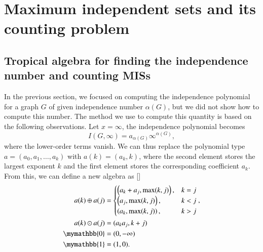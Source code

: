 \documentclass[onefignum, onetabnum]{siamart190516}
\newcommand{\<}{\langle}
\renewcommand{\>}{\rangle}
\newcommand{\red}[1]{[{\bf  \color{red}{ST: #1}}]}
\begin{document}
\section{Maximum independent sets and its counting problem}
\subsection{Tropical algebra for finding the independence number and counting MISs}
In the previous section, we focused on computing the independence polynomial for a graph $G$ of given independence number $\alpha(G)$, but we did not show how to compute this number. The method we use to compute this quantity is based on the following observations. Let $x=\infty$, the independence polynomial becomes
\begin{equation}
I(G, \infty) = a_{\alpha(G)} \infty^{\alpha(G)},
\end{equation}
where the lower-order terms vanish. We can thus replace the polynomial type $a = (a_0, a_1, \ldots, a_k)$ with $a(k) = (a_{k}, k)$, where the second element stores the largest exponent $k$ and the first element stores the corresponding coefficient $a_{k}$. From this, we can define a new algebra as \red{I've changed this, but I don't have strong feelings about this. We can certainly consider changing back. I thought this would be more consistent with the earlier notations and show how it's stored in the program as well.}
\begin{equation}
\begin{split}
    a(k) \oplus a(j) &= \begin{cases}
        \left(a_k + a_j, \max(k,j) \right), & k = j \\
        \left(a_j, \max(k,j) \right), & k < j \\
        \left(a_k, \max(k,j) \right), & k > j
    \end{cases}, \\
    a(k) \odot a(j) &= (a_k a_j, k+j) \\
    \mymathbb{0} &= (0, -\infty)\\
    \mymathbb{1} &= (1, 0). \label{eq:countingtropical}
\end{split}
\end{equation}
\end{document}
